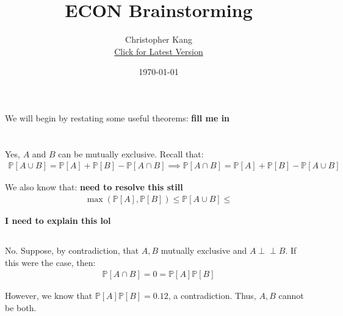 \documentclass{article}
\title{ECON Brainstorming}
\author{Christopher Kang \\
\href{https://www.overleaf.com/read/xbkhntchwshn}{Click for Latest Version}}
\date{\today}
\newcommand{\how}[1]{\colorbox{BurntOrange}{\textbf{#1}}}
\newcommand{\indep}{\perp \!\!\! \perp}
\begin{document}
\maketitle

We will begin by restating some useful theorems:
\how{fill me in}

\section{}
\subsection{}
Yes, $A$ and $B$ can be mutually exclusive. Recall that:
\begin{align}
    \mathbb{P}[A \cup B] = \mathbb{P}[A] + \mathbb{P}[B] - \mathbb{P}[A \cap B] \implies \mathbb{P}[A \cap B] = \mathbb{P}[A] + \mathbb{P}[B] - \mathbb{P}[A \cup B]
\end{align}

We also know that: \how{need to resolve this still}
\begin{align}
    \max(\mathbb{P}[A], \mathbb{P}[B]) \leq \mathbb{P}[A \cup B] \leq
\end{align}

\how{I need to explain this lol}

\subsection{}

\subsection{}

\subsection{}

\subsection{}
No. Suppose, by contradiction, that $A, B$ mutually exclusive and $A \indep B$. If this were the case, then:
\begin{align}
    \mathbb{P}[A \cap B] = 0 = \mathbb{P}[A] \mathbb{P}[B]
\end{align}

However, we know that $\mathbb{P}[A] \mathbb{P}[B] = 0.12$, a contradiction. Thus, $A, B$ cannot be both. 
\end{document}
